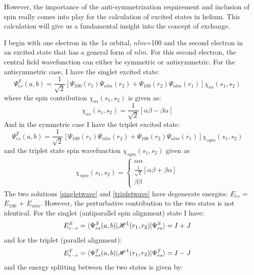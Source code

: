 However, the importance of the anti-symmetrization requirement and inclusion of spin really comes into play for the calculation of excited states in helium. This calculation will give us a fundamental insight into the concept of exchange. 

I begin with one electron in the 1s orbital, $nlm$=100 and the second electron in an excited state that has a general form of $nlm$. For this second electron, the central field wavefunction can either be symmetric or antisymmetric. For the antisymmetric case, I have the singlet excited state:
\begin{equation}
\Psi^S_{es}(a,b)=\frac{1}{\sqrt{2}}[\Psi_{100}(r_1)\Psi_{nlm}(r_2)+\Psi_{100}(r_2)\Psi_{nlm}(r_1)]\chi_{as}(s_1,s_2)
\label{singletwave}
\end{equation}
where the spin contribution $\chi_{as}(s_1,s_2)$ is given as:
\begin{equation}
\chi_{as}(s_1,s_2)=\frac{1}{\sqrt{2}}[\alpha\beta-\beta\alpha]
\end{equation}
And in the symmetric case I have the triplet excited state:
\begin{equation}
\Psi^T_{es}(a,b)=\frac{1}{\sqrt{2}}[\Psi_{100}(r_1)\Psi_{nlm}(r_2)+\Psi_{100}(r_2)\Psi_{nlm}(r_1)]\chi_{sym}(s_1,s_2)
\label{tripletwave}
\end{equation}
and the triplet state spin wavefunction $\chi_{sym}(s_1,s_2)$ given as
\begin{gather*}
\chi_{sym}(s_1,s_2)= 
\begin{cases}
	\alpha\alpha \\
	\frac{1}{\sqrt{2}}[\alpha\beta+\beta\alpha] \\
	\beta\beta
\end{cases}
\end{gather*}
The two solutions \ref{singletwave} and \ref{tripletwave} have degenerate energies: $E_{es}$ = $E_{100}$ + $E_{nlm}$. However, the perturbative contribution to the two states is not identical. For the singlet (antiparallel spin alignment) state I have:
\begin{equation}E_{e-e}^S=\braket{\Psi_{es}^S(a,b)|\mathscr{H}^1(r_1,r_2)|\Psi_{es}^S} = I+J
\label{matrixsinglet}
\end{equation}
and for the triplet (parallel alignment):
\begin{equation}E_{e-e}^T=\braket{\Psi_{es}^T(a,b)|\mathscr{H}^1(r_1,r_2)|\Psi_{es}^T} = I-J
\label{matrixtriplet}
\end{equation}
and the energy splitting between the two states is given by:
